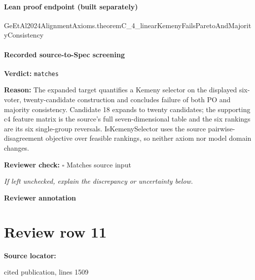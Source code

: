 \documentclass[10pt]{article}
\newcommand{\reviewerbox}{%
  \par\noindent\fbox{\parbox{0.96\linewidth}{\rule{0pt}{0.38in}}}\par
}
\newcommand{\reviewmatch}[1]{%
  \par\noindent\textbf{Reviewer check:} $\square$\; #1\par
  \noindent\emph{If left unchecked, explain the discrepancy or uncertainty below.}\par
}
\begin{document}
\paragraph{Lean proof endpoint (built separately)}\begin{ReviewVerbatim}
GeEtAl2024AlignmentAxioms.theoremC_4_linearKemenyFailsParetoAndMajorityConsistency
\end{ReviewVerbatim}

\paragraph{Recorded source-to-Spec screening}
\textbf{Verdict:} \texttt{matches}
\\
{\raggedright
\textbf{Reason:} The expanded target quantifies a Kemeny selector on the displayed six-\allowbreak{}voter, twenty-\allowbreak{}candidate construction and concludes failure of both PO and majority consistency.\allowbreak{}  Candidate 18 expands to twenty candidates;\allowbreak{} the supporting c4 feature matrix is the source's full seven-\allowbreak{}dimensional table and the six rankings are its six single-\allowbreak{}group reversals.\allowbreak{}  IsKemenySelector uses the source pairwise-\allowbreak{}disagreement objective over feasible rankings, so neither axiom nor model domain changes.\allowbreak{}
\par}
\reviewmatch{Matches source input}
\noindent\textbf{Reviewer annotation}\par
\reviewerbox
\clearpage
\hypertarget{source-claim-e6c3a6a88028de60}{}
\section*{Review row 11}
\textbf{Source locator:} {\footnotesize\raggedright cited publication, lines 1509\par}
\end{document}
